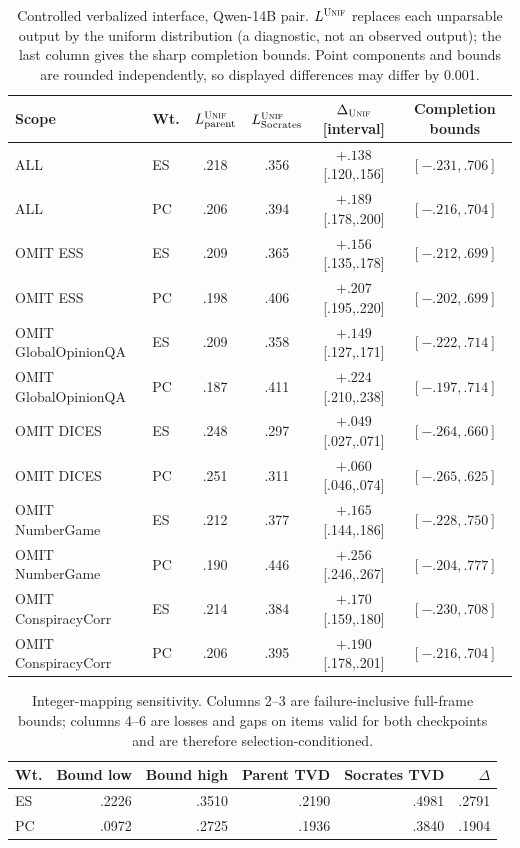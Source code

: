 \documentclass[11pt]{article}
\newcommand{\UNIF}{\textsc{Unif}}
\begin{document}
\begin{table}[t]
\centering
\small
\setlength{\tabcolsep}{2.6pt}
\begin{tabular}{@{}llcccc@{}}
\toprule
Scope & Wt. & $L_{\rm parent}^{\UNIF}$ & $L_{\rm Socrates}^{\UNIF}$ &
$\Delta_{\UNIF}$ [interval] & Completion bounds \\
\midrule
ALL & ES & .218 & .356 & $+.138$ [.120,.156] & $[-.231,.706]$ \\
ALL & PC & .206 & .394 & $+.189$ [.178,.200] & $[-.216,.704]$ \\
OMIT ESS & ES & .209 & .365 & $+.156$ [.135,.178] & $[-.212,.699]$ \\
OMIT ESS & PC & .198 & .406 & $+.207$ [.195,.220] & $[-.202,.699]$ \\
OMIT GlobalOpinionQA & ES & .209 & .358 & $+.149$ [.127,.171] & $[-.222,.714]$ \\
OMIT GlobalOpinionQA & PC & .187 & .411 & $+.224$ [.210,.238] & $[-.197,.714]$ \\
OMIT DICES & ES & .248 & .297 & $+.049$ [.027,.071] & $[-.264,.660]$ \\
OMIT DICES & PC & .251 & .311 & $+.060$ [.046,.074] & $[-.265,.625]$ \\
OMIT NumberGame & ES & .212 & .377 & $+.165$ [.144,.186] & $[-.228,.750]$ \\
OMIT NumberGame & PC & .190 & .446 & $+.256$ [.246,.267] & $[-.204,.777]$ \\
OMIT ConspiracyCorr & ES & .214 & .384 & $+.170$ [.159,.180] & $[-.230,.708]$ \\
OMIT ConspiracyCorr & PC & .206 & .395 & $+.190$ [.178,.201] & $[-.216,.704]$ \\
\bottomrule
\end{tabular}
\caption{Controlled verbalized interface, Qwen-14B pair. $L^{\UNIF}$ replaces
each unparsable output by the uniform distribution (a diagnostic, not an
observed output); the last column gives the sharp completion bounds. Point components and bounds are
rounded independently, so displayed differences may differ by 0.001.}
\label{tab:controlled-full}
\end{table}



\begin{table}[t]
\centering\small
\begin{tabular}{lrrrrr}
\toprule
Wt. & Bound low & Bound high & Parent TVD & Socrates TVD & $\Delta$ \\
\midrule
ES & .2226 & .3510 & .2190 & .4981 & .2791 \\
PC & .0972 & .2725 & .1936 & .3840 & .1904 \\
\bottomrule
\end{tabular}
\caption{Integer-mapping sensitivity. Columns 2--3 are failure-inclusive
full-frame bounds; columns 4--6 are losses and gaps on items valid for both
checkpoints and are therefore selection-conditioned.}
\label{tab:qwen14-ordinal-effects}
\end{table}
\end{document}
